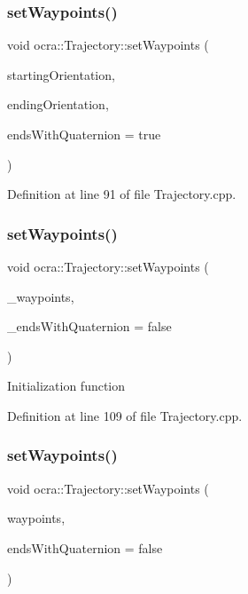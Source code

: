 \subsubsection{\texorpdfstring{set\+Waypoints()}{setWaypoints()}\hspace{0.1cm}{\footnotesize\ttfamily [4/6]}}
{\footnotesize\ttfamily void ocra\+::\+Trajectory\+::set\+Waypoints (\begin{DoxyParamCaption}\item[{Eigen\+::\+Rotation3d \&}]{starting\+Orientation,  }\item[{Eigen\+::\+Rotation3d \&}]{ending\+Orientation,  }\item[{bool}]{ends\+With\+Quaternion = {\ttfamily true} }\end{DoxyParamCaption})}



Definition at line 91 of file Trajectory.\+cpp.

\hypertarget{classocra_1_1Trajectory_a24754dba11643737f02be0bd7c16023e}{}\label{classocra_1_1Trajectory_a24754dba11643737f02be0bd7c16023e} 
\subsubsection{\texorpdfstring{set\+Waypoints()}{setWaypoints()}\hspace{0.1cm}{\footnotesize\ttfamily [5/6]}}
{\footnotesize\ttfamily void ocra\+::\+Trajectory\+::set\+Waypoints (\begin{DoxyParamCaption}\item[{const std\+::list$<$ Eigen\+::\+Vector\+Xd $>$ \&}]{\+\_\+waypoints,  }\item[{bool}]{\+\_\+ends\+With\+Quaternion = {\ttfamily false} }\end{DoxyParamCaption})}

Initialization function

Definition at line 109 of file Trajectory.\+cpp.

\hypertarget{classocra_1_1Trajectory_adde90667693b2648420917e80a39d1e6}{}\label{classocra_1_1Trajectory_adde90667693b2648420917e80a39d1e6} 
\subsubsection{\texorpdfstring{set\+Waypoints()}{setWaypoints()}\hspace{0.1cm}{\footnotesize\ttfamily [6/6]}}
{\footnotesize\ttfamily void ocra\+::\+Trajectory\+::set\+Waypoints (\begin{DoxyParamCaption}\item[{Eigen\+::\+Matrix\+Xd \&}]{waypoints,  }\item[{bool}]{ends\+With\+Quaternion = {\ttfamily false} }\end{DoxyParamCaption})}

